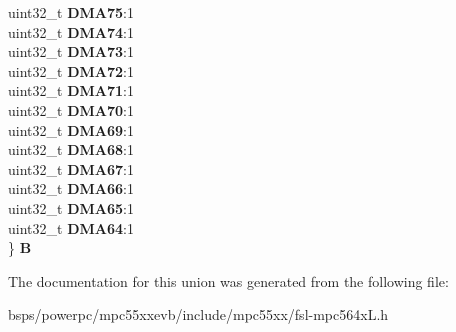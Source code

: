\begin{DoxyCompactItemize}
\begin{tabbing}
\>uint32\_t {\bfseries DMA75}:1\\
\>uint32\_t {\bfseries DMA74}:1\\
\>uint32\_t {\bfseries DMA73}:1\\
\>uint32\_t {\bfseries DMA72}:1\\
\>uint32\_t {\bfseries DMA71}:1\\
\>uint32\_t {\bfseries DMA70}:1\\
\>uint32\_t {\bfseries DMA69}:1\\
\>uint32\_t {\bfseries DMA68}:1\\
\>uint32\_t {\bfseries DMA67}:1\\
\>uint32\_t {\bfseries DMA66}:1\\
\>uint32\_t {\bfseries DMA65}:1\\
\>uint32\_t {\bfseries DMA64}:1\\
\} {\bfseries B}\\

\end{tabbing}\end{DoxyCompactItemize}


The documentation for this union was generated from the following file\+:\begin{DoxyCompactItemize}
\item 
bsps/powerpc/mpc55xxevb/include/mpc55xx/fsl-\/mpc564x\+L.\+h\end{DoxyCompactItemize}
